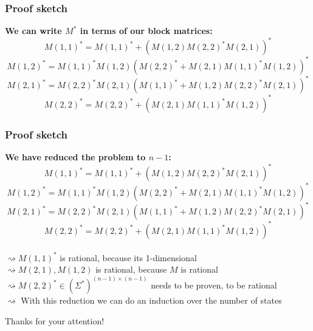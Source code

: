 \documentclass{beamer}
\begin{document}
\begin{frame}
  \frametitle{Proof sketch}
  {\bf We can write $M^*$ in terms of our block matrices:}
  \[ M(1,1)^* = M(1,1)^*+(M(1,2)M(2,2)^*M(2,1))^*\]
  \[ M(1,2)^* = M(1,1)^*M(1,2)(M(2,2)^* + M(2,1)M(1,1)^*M(1,2))^*\]
  \[ M(2,1)^* = M(2,2)^*M(2,1)(M(1,1)^* + M(1,2)M(2,2)^*M(2,1))^*\]
  \[ M(2,2)^* = M(2,2)^*+(M(2,1)M(1,1)^*M(1,2))^*\]
  \vspace{0.5cm}
  \begin{center}
  \end{center}
\end{frame}
\begin{frame}
  \frametitle{Proof sketch}
  {\bf We have reduced the problem to $n-1$:}
  \[ M(1,1)^* = M(1,1)^*+(M(1,2)M(2,2)^*M(2,1))^*\]
  \[ M(1,2)^* = M(1,1)^*M(1,2)(M(2,2)^* + M(2,1)M(1,1)^*M(1,2))^*\]
  \[ M(2,1)^* = M(2,2)^*M(2,1)(M(1,1)^* + M(1,2)M(2,2)^*M(2,1))^*\]
  \[ M(2,2)^* = M(2,2)^*+(M(2,1)M(1,1)^*M(1,2))^*\]\\
  \vspace{0.5cm}
  $\rightsquigarrow M(1,1)^*$ is rational, because its 1-dimensional\\
  $\rightsquigarrow M(2,1), M(1,2)$ is rational, because $M$ is rational\\
  $\rightsquigarrow M(2,2)^* \in (\Sigma^*)^{(n-1) \times (n-1)}$ 
    needs to be proven, to be rational \\
  $\rightsquigarrow $ With this reduction we can do an induction over the number of states
\end{frame}



\begin{frame}
    \Huge{\centerline{Thanks for your attention!}}
    
\end{frame}





\end{document}
